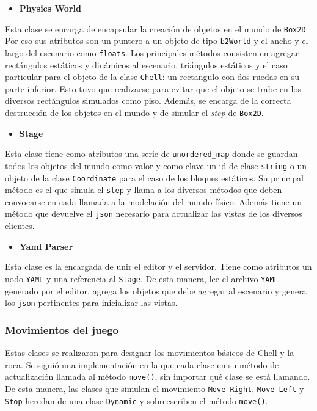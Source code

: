 \documentclass[a4paper]{article}
\begin{document}
\begin{itemize}
	\item \textbf{Physics World}
\end{itemize}
Esta clase se encarga de encapsular la creación de objetos en el mundo de \texttt{Box2D}. Por eso sus atributos son un puntero a un objeto de tipo \texttt{b2World} y el ancho y el largo del escenario como \texttt{floats}. Los principales métodos consisten en agregar rectángulos estáticos y dinámicos al escenario, triángulos estáticos y el caso particular para el objeto de la clase \texttt{Chell}: un rectangulo con dos ruedas en su parte inferior. Esto tuvo que realizarse para evitar que el objeto se trabe en los diversos rectángulos simulados como piso. Además, se encarga de la correcta destrucción de los objetos en el mundo y de simular el \textit{step} de \texttt{Box2D}.

\begin{itemize}
	\item \textbf{Stage}
\end{itemize}

Esta clase tiene como atributos una serie de \texttt{unordered\_map} donde se guardan todos los objetos del mundo como valor y como clave un id de clase \texttt{string} o un objeto de la clase \texttt{Coordinate} para el caso de los bloques estáticos. Su principal método es el que simula el \texttt{step} y llama a los diversos métodos que deben convocarse en cada llamada a la modelación del mundo físico. Además tiene un método que devuelve el \texttt{json} necesario para actualizar las vistas de los diversos clientes.

\begin{itemize}
	\item \textbf{Yaml Parser}
\end{itemize}
Esta clase es la encargada de unir el editor y el servidor. Tiene como atributos un nodo \texttt{YAML} y una referencia al \texttt{Stage}. De esta manera, lee el archivo \texttt{YAML} generado por el editor, agrega los objetos que debe agregar al escenario y genera los \texttt{json} pertinentes para inicializar las vistas.

\subsubsection{Movimientos del juego}

Estas clases se realizaron para designar los movimientos básicos de Chell y la roca. Se siguió una implementación en la que cada clase en su método de actualización llamada al método \texttt{move()}, sin importar qué clase se está llamando. De esta manera, las clases que simulan el movimiento \texttt{Move Right}, \texttt{Move Left} y \texttt{Stop} heredan de una clase \texttt{Dynamic} y sobreescriben el método \texttt{move()}.
\end{document}
